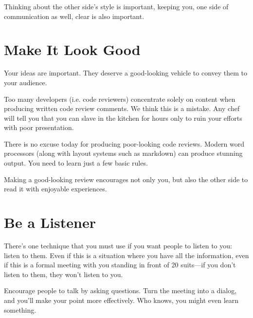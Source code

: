 Thinking about the other side's style is important, keeping you, one side of communication as well, clear is also important.

\section{Make It Look Good}

Your ideas are important. They deserve a good-looking vehicle to convey them to your audience.

Too many developers (i.e. code reviewers) concentrate solely on content when producing written code review comments. We think this is a mistake. Any chef will tell you that you can slave in the kitchen for hours only to ruin your efforts with poor presentation.

There is no excuse today for producing poor-looking code reviews. Modern word processors (along with layout systems such as markdown) can produce stunning output. You need to learn just a few basic rules.

Making a good-looking review encourages not only you, but also the other side to read it with enjoyable experiences.

\section{Be a Listener}

There's one technique that you must use if you want people to listen to you: listen to them. Even if this is a situation where you have all the information, even if this is a formal meeting with you standing in front of 20 suits—if you don't listen to them, they won't listen to you.

Encourage people to talk by asking questions. Turn the meeting into a dialog, and you'll make your point more effectively. Who knows, you might even learn something.

